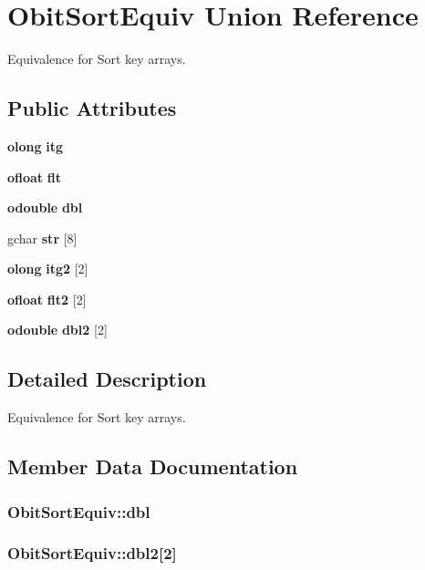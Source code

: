 \section{Obit\-Sort\-Equiv Union Reference}
\label{unionObitSortEquiv}
Equivalence for Sort key arrays.  


\subsection*{Public Attributes}
\begin{CompactItemize}
\item 
{\bf olong} {\bf itg}
\item 
{\bf ofloat} {\bf flt}
\item 
{\bf odouble} {\bf dbl}
\item 
gchar {\bf str} [8]
\item 
{\bf olong} {\bf itg2} [2]
\item 
{\bf ofloat} {\bf flt2} [2]
\item 
{\bf odouble} {\bf dbl2} [2]
\end{CompactItemize}


\subsection{Detailed Description}
Equivalence for Sort key arrays. 



\subsection{Member Data Documentation}
\subsubsection{ {\bf Obit\-Sort\-Equiv::dbl}}\label{unionObitSortEquiv_o2}


\subsubsection{ {\bf Obit\-Sort\-Equiv::dbl2}[2]}\label{unionObitSortEquiv_o6}


